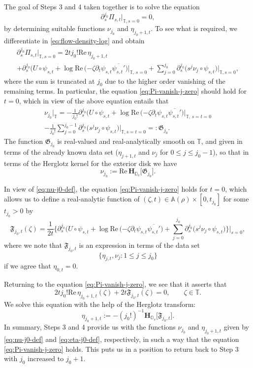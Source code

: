 \documentclass{amsart}
\newcommand{\be}{\begin{equation}}
\newcommand{\ee}{\end{equation}}
\newcommand{\D}{\mathbb{D}}
\newcommand{\T}{\mathbb{T}}
\newcommand{\A}{\mathbb{A}}
\newcommand{\Hop}{\mathbf{H}}
\theoremstyle{definition}
\theoremstyle{remark}
\newcommand{\e}{\mathrm{e}}
\renewcommand{\Re}{\mathrm{Re}\,}
\numberwithin{equation}{subsection}
\begin{document}
The goal of Steps 3 and 4 taken together is to solve the equation
\be\label{eq:Pi-vanish-j-zero}
\partial_s^{j_0}\Pi_{s,t}\big\vert_{\T,s=0}=0,
\ee
by determining suitable functions $\nu_{j_0}$ and $\eta_{j_0+1,t}$. 
To see what is required, we differentiate  in
\eqref{eq:flow-density-log} and obtain
\begin{multline}\label{eq:j_0-diff-Pi}
\partial_s^{j_0}\Pi_{s,t}\big\vert_{\T,s=0}
=2t j_0!\Re \eta_{j_0+1,t}\\
+\partial_s^{j_0}\Big(U\circ\psi_{s,t} +
\log\Re(-\zeta\partial_t\psi_{s,t}
\overline{\psi_{s,t}'}\Big)\Big\vert_{\T,\,s=0}
+\sum_{j=0}^{j_0}\partial_s^{j_0}\big(s^j\nu_j\circ\psi_{s,t}\big)\Big\vert_{\T, s=0},
\end{multline}
where the sum is truncated at $j_0$ due to the higher order vanishing
of the remaining terms.
In particular, the equation \eqref{eq:Pi-vanish-j-zero} should hold for $t=0$,
which in view of the above equation entails that 
\begin{multline}\label{eq:v-j0-equal}
\nu_{j_0}\vert_{\T}
=-\frac{1}{j_0!}\partial_s^{j_0}\Big(U\circ\psi_{s,t} +
\log\Re(-\zeta\partial_t\psi_{s,t}
\overline{\psi_{s,t}'}\Big)\Big\vert_{\T,\,s=t=0} 
\\
- \frac{1}{j_0!}\sum_{j=0}^{j_0-1}\partial_s^{j_0}
\big(s^j\nu_j\circ\psi_{s,t}\big)\Big\vert_{\T, s=t=0}=:\mathfrak{G}_{j_0}.
\end{multline}
The function $\mathfrak{G}_{j_0}$ is real-valued and 
real-analytically smooth on $\T$, and 
given in terms of the already known data set 
($\eta_{j+1,t}$ and $\nu_j$ for $0\le j\le j_0-1$), 
so that in terms of the Herglotz kernel for
the exterior disk we have
\be\label{eq:nu-j0-def}
\nu_{j_0}:=\Re\Hop_{\D_\e}\big[\mathfrak{G}_{j_0}\big].
\ee


\medskip

In view of \eqref{eq:nu-j0-def}, the equation 
\eqref{eq:Pi-vanish-j-zero} holds for $t=0$, 
which allows us to define a real-analytic function 
of $(\zeta,t)\in\A(\rho)\times [0,t_{j_0}]$ for some $t_{j_0}>0$ by
\be
\mathfrak{F}_{j_0,t}(\zeta)=
\frac{1}{2t}\Big\{\partial_s^{j_0}\Big(U\circ\psi_{s,t} +
\log\Re(-\zeta\partial_t\psi_{s,t}
\overline{\psi_{s,t}'}\Big)
+\sum_{j=0}^{j_0}\partial_s^{j_0}\big(s^j\nu_j\circ\psi_{s,t}\big)\Big\}
\Big\vert_{s=0},
\ee
where we note that $\mathfrak{F}_{j_0,t}$ is an expression 
in terms of the data set 
\be
\{\eta_{j,t}, \nu_{j}: 1\le j\le j_0\}
\ee
if we agree that $\eta_{0,t}=0$.

Returning to the equation \eqref{eq:Pi-vanish-j-zero}, we see that
it asserts that
\be
2tj_0!\Re \eta_{j_0+1,t}(\zeta)+2t\mathfrak{F}_{j_0,t}(\zeta) =0,\qquad \zeta\in\T.
\ee
We solve this equation with the help of the Herglotz transform:
\be\label{eq:eta-j0-def}
\eta_{j_0+1,t}:=-(j_0!)^{-1}\Hop_{\D_\e}\big[\mathfrak{F}_{j_0,t}\big].
\ee
In summary, Steps 3 and 4 provide us with the 
functions $\nu_{j_0}$ and $\eta_{j_0+1,t}$ 
given by \eqref{eq:nu-j0-def} and 
\eqref{eq:eta-j0-def}, respectively, in such a way that
the equation \eqref{eq:Pi-vanish-j-zero} holds. 
This puts us in a position to return back
to Step 3 with $j_0$ increased to $j_0+1$.
\end{document}
